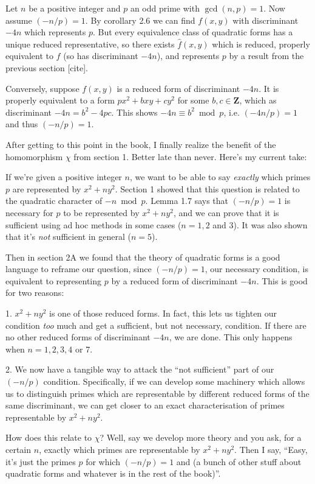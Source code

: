 Let $n$ be a positive integer and $p$ an odd prime with $\gcd(n,p)=1$. Now assume $(-n/p)=1$. By corollary 2.6 we can find $f(x,y)$ with discriminant $-4n$ which represents $p$. But every equivalence class of quadratic forms has a unique reduced representative, so there exists $\hat{f}(x,y)$ which is reduced, properly equivalent to $f$ (so has discriminant $-4n$), and represents $p$ by a result from the previous section [cite].

Conversely, suppose $f(x,y)$ is a reduced form of discriminant $-4n$. It is properly equivalent to a form $px^2 + bxy + cy^2$ for some $b,c\in\mathbf{Z}$, which as discriminant $-4n = b^2-4pc$. This shows $-4n\equiv b^2\bmod p$, i.e. $(-4n/p)=1$ and thus $(-n/p)=1$.

After getting to this point in the book, I finally realize the benefit of the homomorphism $\chi$ from section 1. Better late than never. Here's my current take:

If we're given a positive integer $n$, we want to be able to say \emph{exactly} which primes $p$ are represented by $x^2 + ny^2$. Section 1 showed that this question is related to the quadratic character of $-n\bmod p$. Lemma 1.7 says that $(-n/p)=1$ is necessary for $p$ to be represented by $x^2+ny^2$, and we can prove that it is sufficient using ad hoc methods in some cases ($n=1, 2$ and 3). It was also shown that it's \emph{not} sufficient in general ($n=5$).

Then in section 2A we found that the theory of quadratic forms is a good language to reframe our question, since $(-n/p)=1$, our necessary condition, is equivalent to representing $p$ by a reduced form of discriminant $-4n$. This is good for two reasons:

1. $x^2+ny^2$ is one of those reduced forms. In fact, this lets us tighten our condition \emph{too} much and get a sufficient, but not necessary, condition. If there are no other reduced forms of discriminant $-4n$, we are done. This only happens when $n=1,2,3,4$ or 7.

2. We now have a tangible way to attack the ``not sufficient'' part of our $(-n/p)$ condition. Specifically, if we can develop some machinery which allows us to distinguish primes which are representable by different reduced forms of the same discriminant, we can get closer to an exact characterisation of primes representable by $x^2+ny^2$.

How does this relate to $\chi$? Well, say we develop more theory and you ask, for a certain $n$, exactly which primes are representable by $x^2+ny^2$. Then I say, ``Easy, it's just the primes $p$ for which $(-n/p)=1$ and (a bunch of other stuff about quadratic forms and whatever is in the rest of the book)''.

